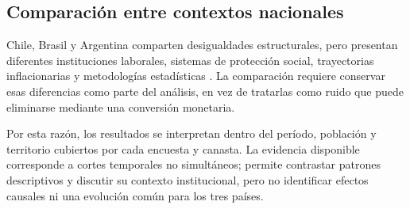 \subsection{Comparación entre contextos nacionales}

Chile, Brasil y Argentina comparten desigualdades estructurales, pero presentan diferentes instituciones laborales, sistemas de protección social, trayectorias inflacionarias y metodologías estadísticas \parencite{cepalPanoramaSocialAmerica2025, CostaRibeiroCarcalhaes2024}. La comparación requiere conservar esas diferencias como parte del análisis, en vez de tratarlas como ruido que puede eliminarse mediante una conversión monetaria.

Por esta razón, los resultados se interpretan dentro del período, población y territorio cubiertos por cada encuesta y canasta. La evidencia disponible corresponde a cortes temporales no simultáneos; permite contrastar patrones descriptivos y discutir su contexto institucional, pero no identificar efectos causales ni una evolución común para los tres países.
